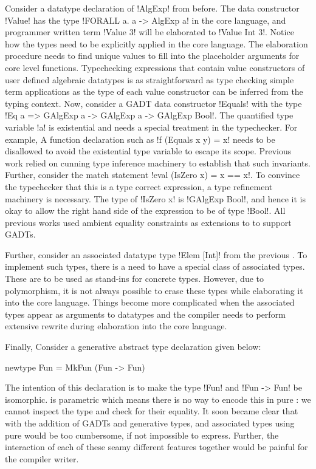 \documentclass[screen,nonacm]{acmart}
\begin{document}
Consider a datatype declaration of !AlgExp! from before. The data
constructor !Value! has the type !FORALL a. a -> AlgExp a! in the core
language, and programmer written term !Value 3! will be elaborated to
!Value Int 3!. Notice how the types need to be explicitly applied in
the core language. The elaboration procedure needs to find unique
values to fill into the placeholder arguments for core level
functions. Typechecking expressions that contain value constructors of
user defined algebraic datatypes is as straightforward as type
checking simple term applications as the type of each value
constructor can be inferred from the typing context.
Now, consider a GADT data constructor !Equals! with the type
!Eq a => GAlgExp a -> GAlgExp a -> GAlgExp Bool!. The
quantified type variable !a! is existential and needs a special
treatment in the typechecker. For example, A function declaration such
as !f (Equals x y) = x! needs to be disallowed to avoid the
existential type variable to escape its scope. Previous work relied on
cunning type inference machinery to establish that such
invariants. Further, consider the match statement
!eval (IsZero x) = x == x!. To convince the typechecker that this is a
type correct expression, a type refinement machinery is necessary. The
type of !IsZero x! is !GAlgExp Bool!, and hence it is okay to allow
the right hand side of the expression to be of type !Bool!. All
previous works\cite{cheney_first-class_2003, xi_guarded_2003,
  peyton_jones_simple_2006} used ambient equality constraints as
extensions to \SF to support GADTs.

Further, consider an associated datatype type !Elem [Int]! from the previous . To implement such types, there is a need to have a special class of associated types. These are to be used as stand-ins for concrete types. However, due to polymorphism, it is not always possible to erase these types while elaborating it into the core language. Things become more complicated when the associated types appear as arguments to datatypes and the compiler needs to perform extensive rewrite during elaboration into the core language.

Finally, Consider a generative abstract type declaration given below:

\begin{CenteredBox}
\begin{code}
newtype Fun = MkFun (Fun -> Fun)
\end{code}
\end{CenteredBox}
The intention of this declaration is to make the type !Fun! and !Fun -> Fun! be isomorphic. \SF is parametric which means there is no way to encode this in pure \SF: we cannot inspect the type and check for their equality. It soon became clear that with the addition of GADTs and generative types, and associated types using pure \SF would be too cumbersome, if not impossible to express. Further, the interaction of each of these seamy different features together would be painful for the compiler writer.
\end{document}
